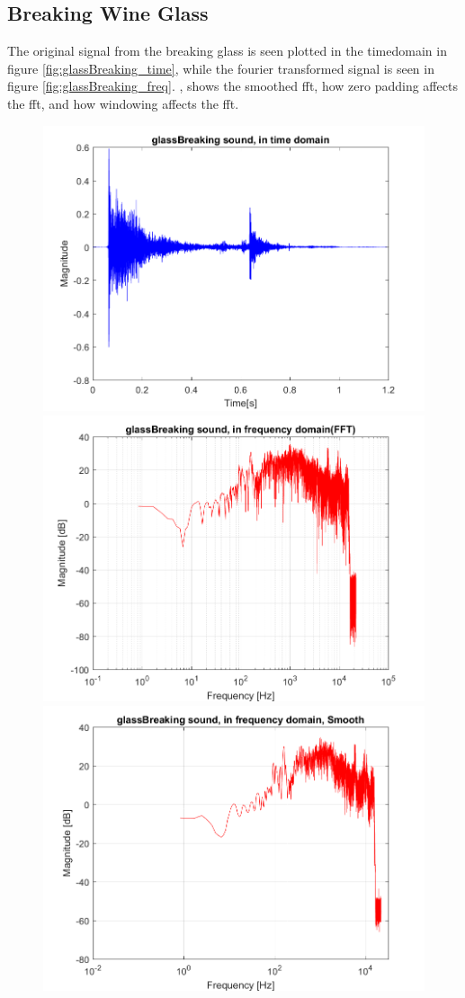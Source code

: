 \subsection{Breaking Wine Glass}

The original signal from the breaking glass is seen plotted in the timedomain in figure \ref{fig:glassBreaking_time}, while the fourier transformed signal is seen in figure \ref{fig:glassBreaking_freq}.
, shows the smoothed fft, how zero padding affects the fft, and how windowing affects the fft.

\begin{figure}[htb!]
	\centering
	{\includegraphics[width=0.45\linewidth]{code/glassBreaking_figure1.png}}
	{\includegraphics[width=0.45\linewidth]{code/glassBreaking_figure2.png}}
	{\includegraphics[width=0.45\linewidth]{code/glassBreaking_figure3.png}}

\end{figure}
